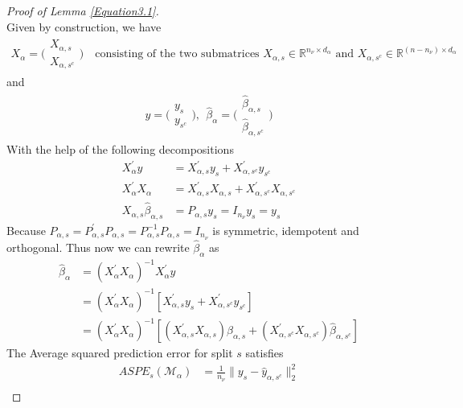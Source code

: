 \documentclass[Research_Module_ES.tex]{subfiles}
\begin{document}
\begin{proof}[Proof of Lemma \ref{Equation3.1}]~\\
	Given by construction, we have
	\begin{align*}
		X_\alpha=\Big(\begin{matrix}
		X_{\alpha,s}\\ X_{\alpha,s^c}
		\end{matrix}\Big)
		\text{~~~consisting of the two submatrices~} X_{\alpha,s}\in\mathbb{R}^{n_\nu\times d_\alpha} \text{~and~} X_{\alpha,s^c}\in\mathbb{R}^{(n-n_\nu)\times d_\alpha}
	\end{align*}
	and 
	\begin{align*}
		y=\Big(\begin{matrix}
		y_{s}\\ y_{s^c}
		\end{matrix}\Big),~~\hat{\beta}_\alpha=\Big(\begin{matrix}
		\hat{\beta}_{\alpha,s}\\ \hat{\beta}_{\alpha,s^c}
		\end{matrix}\Big)
	\end{align*}
	With the help of the following decompositions
	\begin{align*}
		X_\alpha^\prime y&=X_{\alpha,s}^\prime y_s+X_{\alpha,s^c}^\prime y_{s^c}\\
		X_\alpha^\prime X_\alpha&=X_{\alpha,s}^\prime X_{\alpha,s}+X_{\alpha,s^c}^\prime X_{\alpha,s^c}\\
		X_{\alpha,s} \hat{\beta}_{\alpha,s}&=P_{\alpha,s}y_s=I_{n_\nu}y_s=y_s
	\end{align*}
	Because $P_{\alpha,s}=P_{\alpha,s}^\prime P_{\alpha,s}=P_{\alpha,s}^{-1} P_{\alpha,s}=I_{n_\nu}$ is symmetric, idempotent and orthogonal. Thus now 
	we can rewrite $\hat{\beta}_\alpha$ as
	\begin{align}
		\hat{\beta}_\alpha&=(X_\alpha^\prime X_\alpha)^{-1}X_\alpha^\prime y   \nonumber\\
		&=(X_\alpha^\prime X_\alpha)^{-1}[X_{\alpha,s}^\prime y_s+X_{\alpha,s^c}^\prime y_{s^c}]  \nonumber \\
		&=(X_\alpha^\prime X_\alpha)^{-1}[(X_{\alpha,s}^\prime X_{\alpha,s}) \hat{\beta}_{\alpha,s}+(X_{\alpha,s^c}^\prime X_{\alpha,s^c})\hat{\beta}_{\alpha,s^c}]
		\label{beta_alpha_hat_decomposition}
	\end{align}
	The Average squared prediction error for split $s$ satisfies
	\begin{align*}
	ASPE_{s}(\mathcal{M}_\alpha)&=\frac{1}{n_\nu}\parallel y_s-\hat{y}_{\alpha,s^c}\parallel_2^2\\

\end{align*}
\end{proof}
\end{document}
